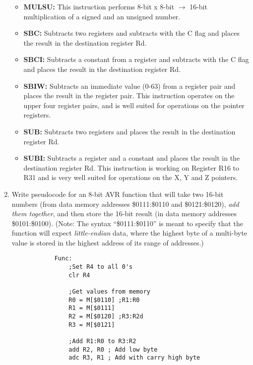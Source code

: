 \documentclass[12pt,letterpaper]{article}
\begin{document}
\begin{enumerate}
\begin{itemize}
			\item 
			\textbf{MULSU:} This instruction performs 8-bit x 8-bit $\rightarrow$ 16-bit multiplication of a signed and an unsigned number.
			
			\item 
			\textbf{SBC:} Subtracts two registers and subtracts with the C flag and places the result in the destination register Rd.
			
			\item 
			\textbf{SBCI:} Subtracts a constant from a register and subtracts with the C flag and places the result in the destination register Rd.
			
			\item 
			\textbf{SBIW:} Subtracts an immediate value (0-63) from a register pair and places the result in the register pair. This instruction operates on the upper four register pairs, and is well suited for operations on the pointer registers.
			
			\item 
			\textbf{SUB:} Subtracts two registers and places the result in the destination register Rd.
			
			\item 
			\textbf{SUBI:} 
			Subtracts a register and a constant and places the result in the destination register Rd. This instruction is working on Register R16 to R31 and is very well suited for operations on the X, Y and Z pointers.
			
		\end{itemize}
	
		\clearpage
		
		\item 
		Write pseudocode for an 8-bit AVR function that will take two 16-bit numbers (from data memory addresses \$0111:\$0110 and \$0121:\$0120),\textit{ add
		them together}, and then store the 16-bit result (in data memory addresses \$0101:\$0100). 
		(Note: The syntax “\$0111:\$0110” is meant to specify that the function will expect \textit{little-endian} data, where the highest byte of a multi-byte value is stored in the highest address of its range of addresses.)

		\begin{lstlisting}
			Func:
				;Set R4 to all 0's
				clr R4
				
				;Get values from memory
				R0 = M[$0110] ;R1:R0
				R1 = M[$0111]
				R2 = M[$0120] ;R3:R2d
				R3 = M[$0121]
				
				;Add R1:R0 to R3:R2
				add R2, R0 ; Add low byte
				adc R3, R1 ; Add with carry high byte
				

\end{lstlisting}
\end{enumerate}
\end{document}
